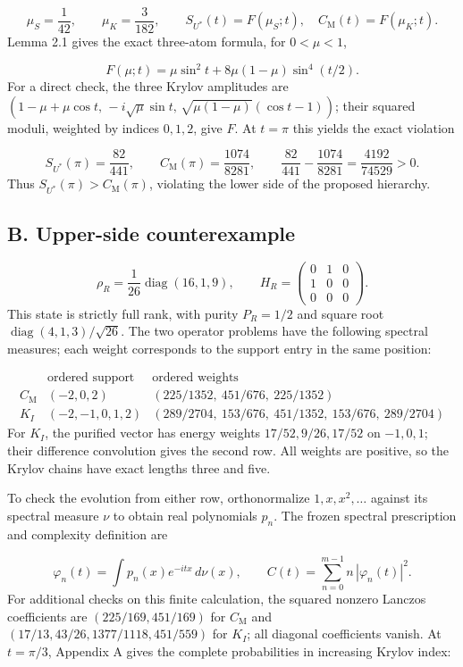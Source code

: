 \documentclass[11pt,a4paper]{article}
\begin{document}
\[
\mu_S=\frac1{42},\qquad \mu_K=\frac3{182},\qquad
S_{U^*}(t)=F(\mu_S;t),\quad C_{\mathrm M}(t)=F(\mu_K;t).
\]
Lemma 2.1 gives the exact three-atom formula, for $0<\mu<1$,

\[
F(\mu;t)=\mu\sin^2t+8\mu(1-\mu)\sin^4(t/2).
\]
For a direct check, the three Krylov amplitudes are
$(1-\mu+\mu\cos t,\,-i\sqrt\mu\sin t,\,\sqrt{\mu(1-\mu)}(\cos t-1))$;
their squared moduli, weighted by indices $0,1,2$, give $F$.
At $t=\pi$ this yields the exact violation

\[
S_{U^*}(\pi)=\frac{82}{441},\qquad
C_{\mathrm M}(\pi)=\frac{1074}{8281},\qquad
\frac{82}{441}-\frac{1074}{8281}=\frac{4192}{74529}>0.
\]
Thus $S_{U^*}(\pi)>C_{\mathrm M}(\pi)$, violating the lower side of the proposed hierarchy.

\newpage
\subsection*{B. Upper-side counterexample}
\[
\rho_R=\frac1{26}\operatorname{diag}(16,1,9),\qquad
H_R=\begin{pmatrix}0&1&0\\1&0&0\\0&0&0\end{pmatrix}.
\]
This state is strictly full rank, with purity $P_R=1/2$ and square root
$\operatorname{diag}(4,1,3)/\sqrt{26}$. The two operator problems have the following
spectral measures; each weight corresponds to the support entry in the same position:

\[
\begin{array}{c|c|l}
 &\text{ordered support}&\text{ordered weights}\\ \hline
C_{\mathrm M}&(-2,0,2)&(225/1352,\ 451/676,\ 225/1352)\\[3pt]
K_I&(-2,-1,0,1,2)&(289/2704,\ 153/676,\ 451/1352,\ 153/676,\ 289/2704)
\end{array}
\]
For $K_I$, the purified vector has energy weights $17/52,9/26,17/52$
on $-1,0,1$; their difference convolution gives the second row.
All weights are positive, so the Krylov chains have exact lengths three and five.

To check the evolution from either row, orthonormalize $1,x,x^2,\ldots$
against its spectral measure $\nu$ to obtain real polynomials $p_n$.
The frozen spectral prescription and complexity definition are

\[
\varphi_n(t)=\int p_n(x)e^{-itx}\,d\nu(x),\qquad
C(t)=\sum_{n=0}^{m-1}n\,|\varphi_n(t)|^2.
\]
For additional checks on this finite calculation, the squared nonzero Lanczos
coefficients are $(225/169,451/169)$ for $C_{\mathrm M}$ and
$(17/13,43/26,1377/1118,451/559)$ for $K_I$; all diagonal coefficients vanish.
At $t=\pi/3$, Appendix A gives the complete probabilities in increasing Krylov index:
\end{document}
